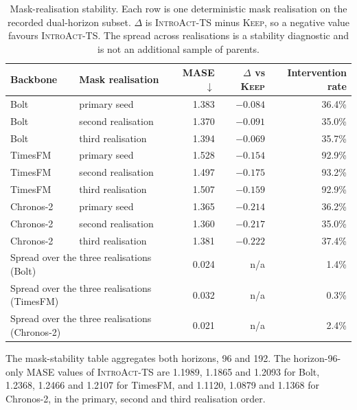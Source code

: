\documentclass{article}
\newcommand{\introact}{\textsc{IntroAct-TS}}
\begin{document}
\begin{table}[!t]
  \caption{Mask-realisation stability. Each row is one deterministic mask realisation on the
  recorded dual-horizon subset. $\Delta$ is \introact{} minus \textsc{Keep}, so a negative
  value favours \introact{}. The spread across realisations is a stability diagnostic and is not
  an additional sample of parents.}
  \label{tab:app-seeds}
  \centering
  \small
  \setlength{\tabcolsep}{4pt}
\begin{tabular*}{\textwidth}{@{\extracolsep{\fill}}llrrr@{}}
    \toprule
    Backbone & Mask realisation & MASE $\downarrow$ & $\Delta$ vs \textsc{Keep} & Intervention rate \\
    \midrule
    Bolt      & primary seed        & 1.383 & $-0.084$ & 36.4\% \\
    Bolt      & second realisation  & 1.370 & $-0.091$ & 35.0\% \\
    Bolt      & third realisation   & 1.394 & $-0.069$ & 35.7\% \\
    \midrule
    TimesFM   & primary seed        & 1.528 & $-0.154$ & 92.9\% \\
    TimesFM   & second realisation  & 1.497 & $-0.175$ & 93.2\% \\
    TimesFM   & third realisation   & 1.507 & $-0.159$ & 92.9\% \\
    \midrule
    Chronos-2 & primary seed        & 1.365 & $-0.214$ & 36.2\% \\
    Chronos-2 & second realisation  & 1.360 & $-0.217$ & 35.0\% \\
    Chronos-2 & third realisation   & 1.381 & $-0.222$ & 37.4\% \\
    \midrule
    \multicolumn{2}{l}{Spread over the three realisations (Bolt)}      & 0.024 & n/a & 1.4\% \\
    \multicolumn{2}{l}{Spread over the three realisations (TimesFM)}   & 0.032 & n/a & 0.3\% \\
    \multicolumn{2}{l}{Spread over the three realisations (Chronos-2)} & 0.021 & n/a & 2.4\% \\
    \bottomrule
  \end{tabular*}
\end{table}

The mask-stability table aggregates both horizons, 96 and 192.
The horizon-96-only MASE values of \introact{} are 1.1989, 1.1865 and 1.2093 for Bolt,
1.2368, 1.2466 and 1.2107 for TimesFM, and 1.1120, 1.0879 and 1.1368 for Chronos-2, in the
primary, second and third realisation order.
\end{document}
